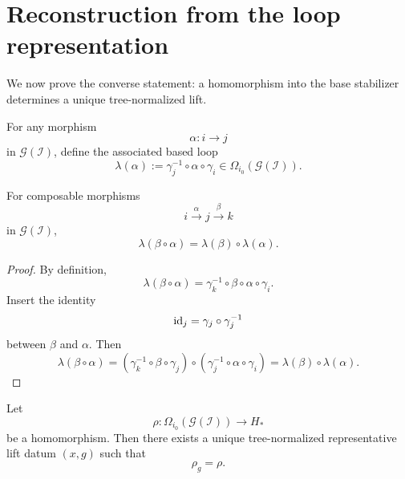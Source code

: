 \section{Reconstruction from the loop representation}
We now prove the converse statement: a homomorphism into the base
stabilizer determines a unique tree-normalized lift.
\begin{definition}
	For any morphism
	\[
		\alpha:i\to j
	\]
	in \(\mathcal G(\mathcal I)\), define the associated based loop
	\[
		\lambda(\alpha):=\gamma_j^{-1}\circ \alpha\circ \gamma_i
		\in
		\Omega_{i_0}(\mathcal G(\mathcal I)).
	\]
\end{definition}
\begin{lemma}
	\label{lem:DO-lambda}
	For composable morphisms
	\[
		i\xrightarrow{\alpha} j\xrightarrow{\beta} k
	\]
	in \(\mathcal G(\mathcal I)\),
	\[
		\lambda(\beta\circ \alpha)=\lambda(\beta)\circ \lambda(\alpha).
	\]
\end{lemma}
\begin{proof}
	By definition,
	\[
		\lambda(\beta\circ \alpha)
		=
		\gamma_k^{-1}\circ \beta\circ \alpha\circ \gamma_i.
	\]
	Insert the identity
	\[
		\operatorname{id}_j=\gamma_j\circ\gamma_j^{-1}
	\]
	between \(\beta\) and \(\alpha\). Then
	\[
		\lambda(\beta\circ \alpha)
		=
		(\gamma_k^{-1}\circ \beta\circ \gamma_j)
		\circ
		(\gamma_j^{-1}\circ \alpha\circ \gamma_i)
		=
		\lambda(\beta)\circ \lambda(\alpha).
	\]
\end{proof}
\begin{proposition}
	\label{prop:DO-reconstruct}
	Let
	\[
		\rho:\Omega_{i_0}(\mathcal G(\mathcal I))\to H_*
	\]
	be a homomorphism. Then there exists a unique tree-normalized
	representative lift datum \((x,g)\) such that
	\[
		\rho_g=\rho.
	\]
\end{proposition}
